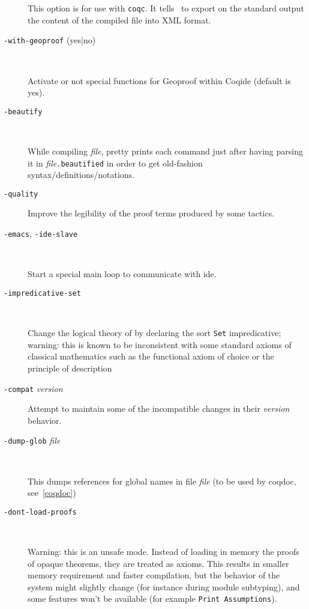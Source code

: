 \begin{description}
  This option is for use with {\tt coqc}. It tells \Coq\ to export on
  the standard output the content of the compiled file into XML format.

\item[{\tt -with-geoproof} (yes|no)]\ 

  Activate or not special functions for Geoproof within Coqide (default is yes).

\item[{\tt -beautify}]\ 

  While compiling {\em file}, pretty prints each command just after having parsing
  it in {\em file}{\tt .beautified} in order to get old-fashion
  syntax/definitions/notations.

\item[{\tt -quality}]

  Improve the legibility of the proof terms produced by some tactics.

\item[{\tt -emacs}, {\tt -ide-slave}]\ 

  Start a special main loop to communicate with ide.

\item[{\tt -impredicative-set}]\ 

  Change the logical theory of {\Coq} by declaring the sort {\tt Set}
  impredicative; warning: this is known to be inconsistent with
  some standard axioms of classical mathematics such as the functional
  axiom of choice or the principle of description

\item[{\tt -compat} {\em version}] \mbox{}

  Attempt to maintain some of the incompatible changes in their {\em version}
  behavior.

\item[{\tt -dump-glob} {\em file}]\ 

  This dumps references for global names in file {\em file}
  (to be used by coqdoc, see~\ref{coqdoc})

\item[{\tt -dont-load-proofs}]\ 

  Warning: this is an unsafe mode.
  Instead of loading in memory the proofs of opaque theorems, they are
  treated as axioms. This results in smaller memory requirement and
  faster compilation, but the behavior of the system might slightly change
  (for instance during module subtyping), and some features won't be
  available (for example {\tt Print Assumptions}).


\end{description}
